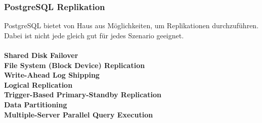 
\subsubsection{\Gls{PostgreSQL} Replikation}
PostgreSQL bietet von Haus aus Möglichkeiten, um Replikationen durchzuführen.
Dabei ist nicht jede gleich gut für jedes Szenario geeignet\cite{FZAHA89U}.\\\\
\textbf{Shared Disk Failover}\\
\textbf{File System (Block Device) Replication}\\
\textbf{Write-Ahead Log Shipping}\\
\textbf{Logical Replication}\\
\textbf{Trigger-Based Primary-Standby Replication}\\
\textbf{Data Partitioning}\\
\textbf{Multiple-Server Parallel Query Execution}\\
\textbf{}\\
\textbf{}\\
\textbf{}\\
\textbf{}\\
\textbf{}\\
